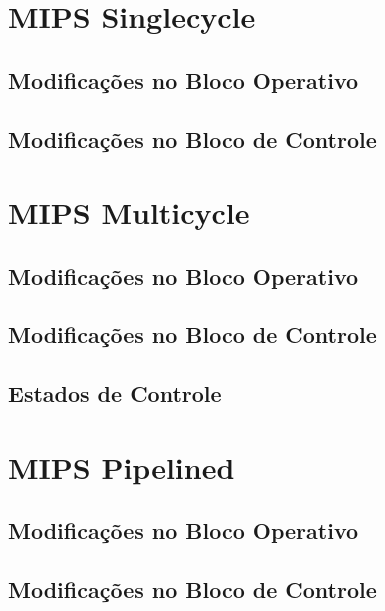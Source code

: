 \documentclass{report}
\let\oldsection\section
\renewcommand\section{\clearpage\oldsection}
\begin{document}
    \renewcommand{\contentsname}{Sumário}
    \tableofcontents
    \clearpage

    \section{MIPS Singlecycle}
        \subsection{Modificações no Bloco Operativo}
        \subsection{Modificações no Bloco de Controle}

    \section{MIPS Multicycle}
        \subsection{Modificações no Bloco Operativo}
        \subsection{Modificações no Bloco de Controle}
        \subsection{Estados de Controle}

    \section{MIPS Pipelined}
        \subsection{Modificações no Bloco Operativo}
        \subsection{Modificações no Bloco de Controle}
\end{document}
